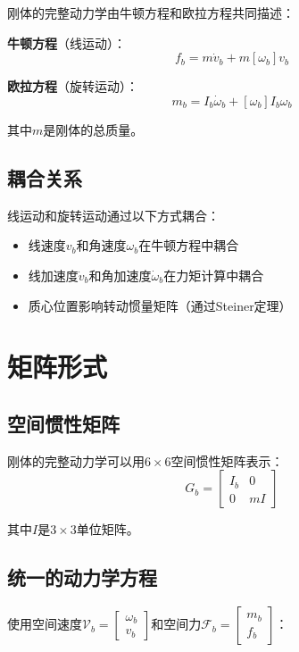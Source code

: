 \documentclass[12pt,a4paper]{article}
\begin{document}
刚体的完整动力学由牛顿方程和欧拉方程共同描述：

\textbf{牛顿方程}（线运动）：
\begin{equation}
f_b = m \dot{v}_b + m [\omega_b] v_b
\label{eq:newton_equation}
\end{equation}

\textbf{欧拉方程}（旋转运动）：
\begin{equation}
m_b = I_b \dot{\omega}_b + [\omega_b] I_b \omega_b
\label{eq:euler_equation_complete}
\end{equation}

其中$m$是刚体的总质量。

\subsection{耦合关系}

线运动和旋转运动通过以下方式耦合：
\begin{itemize}
\item 线速度$v_b$和角速度$\omega_b$在牛顿方程中耦合
\item 线加速度$\dot{v}_b$和角加速度$\dot{\omega}_b$在力矩计算中耦合
\item 质心位置影响转动惯量矩阵（通过Steiner定理）
\end{itemize}

\section{矩阵形式}

\subsection{空间惯性矩阵}

刚体的完整动力学可以用$6 \times 6$空间惯性矩阵表示：
\begin{equation}
G_b = \begin{bmatrix}
I_b & 0 \\
0 & m I
\end{bmatrix}
\end{equation}

其中$I$是$3 \times 3$单位矩阵。

\subsection{统一的动力学方程}

使用空间速度$\mathcal{V}_b = \begin{bmatrix} \omega_b \\ v_b \end{bmatrix}$和空间力$\mathcal{F}_b = \begin{bmatrix} m_b \\ f_b \end{bmatrix}$：
\end{document}
